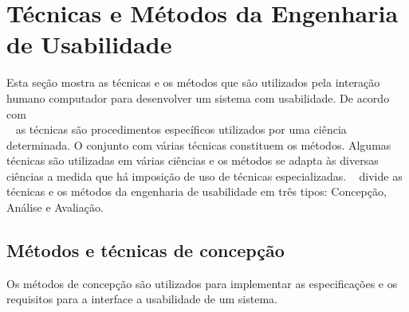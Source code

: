 
\section{Técnicas e Métodos da Engenharia de Usabilidade}

Esta seção mostra as técnicas e os métodos que são utilizados pela interação humano computador para desenvolver um sistema com usabilidade.
%
De acordo com \\ ~ as técnicas são procedimentos específicos utilizados por uma ciência determinada. O conjunto com várias técnicas constituem os métodos. Algumas técnicas são utilizadas em várias ciências e os métodos se adapta às diversas ciências a medida que há imposição de uso de técnicas especializadas.
%
~ divide as técnicas e os métodos da engenharia de usabilidade em três tipos: Concepção, Análise e Avaliação.


\subsection{Métodos e técnicas de concepção}

	Os métodos de concepção são utilizados para implementar as especificações e os requisitos para a interface a usabilidade de um sistema.

